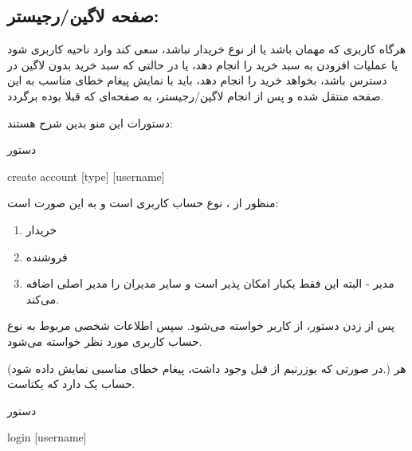 \documentclass[]{article}
\begin{document}
\newpage


\subsection*{{\titr صفحه لاگین/رجیستر:}}

هرگاه کاربری که مهمان باشد یا از نوع خریدار نباشد، سعی کند وارد ناحیه کاربری شود یا عملیات افزودن به سبد خرید را انجام دهد، یا در حالتی که سبد خرید بدون لاگین در دسترس باشد، بخواهد خرید را انجام دهد، باید با نمایش پیغام خطای مناسب به این صفحه منتقل شده و پس از انجام لاگین/رجیستر، به صفحه‌ای که قبلا بوده برگردد.

دستورات این منو بدین شرح هستند:


\begin{mybox}[colback=yellow]{دستور}


\begin{latin}

create account [type] [username]

\end{latin}

\end{mybox}

منظور از ، نوع حساب کاربری است و به این صورت است:

\begin{enumerate}

\item
 خریدار
 
 \item
 فروشنده
 
 \item
 مدیر - البته این فقط یکبار امکان پذیر است و سایر مدیران را مدیر اصلی اضافه می‌کند.
 
 \end{enumerate}
 
پس از زدن دستور، از کاربر  خواسته می‌شود. سپس اطلاعات شخصی مربوط به نوع حساب کاربری مورد نظر خواسته‌ می‌شود.

(در صورتی که یوزرنیم از قبل وجود داشت، پیغام خطای مناسبی نمایش داده شود.)
هر حساب یک  دارد که یکتاست.

\hrulefill

\begin{mybox}[colback=yellow]{دستور}


\begin{latin}

login [username]

\end{latin}

\end{mybox}
\end{document}
